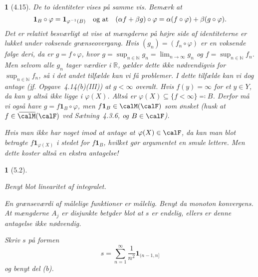 \documentclass[a4paper, 11pt, article, danish, oneside]{memoir}
\newcommand{\overbar}[3]{\mkern #1mu\overline{\mkern-#1mu#3\mkern-#2mu}\mkern #2mu}
\newcommand{\naturals}{\mathbb{N}}
\newcommand{\reals}{\mathbb{R}}
\DeclarePairedDelimiter{\auxdelimparen}{(}{)}
\newcommand{\meas}[2][]{\calM\auxdelimparen[#1]{#2}}
\newcommand{\extmeas}[2][]{\overbar{4.5}{0.5}{\calM}\auxdelimparen[#1]{#2}}
\newcommand{\indicator}[1]{\mathbf{1}_{#1}}
\newcommand{\eqdef}{\eqqcolon}
\renewcommand{\phi}{\varphi}
\newcommand{\preim}[2][]{^{-1}\auxdelimparen[#1]{#2}}
\newcommand{\pencilsymbol}{\raisebox{-2pt}{\normalfont\PencilLeft}}
\theoremstyle{changedotcustomnumber}
\newtheorem{opgave}{\pencilsymbol}
\theoremstyle{changedotbreakcustomnumber}
\newtheorem{opgavebreak}{\pencilsymbol}
\begin{document}
\begin{opgave}[4.15]
    De to identiteter vises på samme vis. Bemærk at
    \begin{equation*}
        \indicator{B} \circ \phi
            = \indicator{\phi\preim{B}}
        \quad \text{og at} \quad
        (\alpha f + \beta g) \circ \phi
            = \alpha (f \circ \phi) + \beta (g \circ \phi).
    \end{equation*}
    Det er relativt besværligt at vise at mængderne på højre side af identiteterne er lukket under voksende grænseovergang. Hvis $(g_n) = (f_n \circ \phi)$ er en voksende følge deri, da er $g = f \circ \phi$, hvor $g = \sup_{n \in \naturals} g_n = \lim_{n \to \infty} g_n$ og $f = \sup_{n \in \naturals} f_n$. Men selvom alle $g_n$ tager værdier i $\reals$, gælder dette ikke nødvendigvis for $\sup_{n \in \naturals} f_n$, så i det andet tilfælde kan vi få problemer. I dette tilfælde kan vi dog antage (jf. Opgave~4.14(b)(III)) at $g < \infty$ overalt. Hvis $f(y) = \infty$ for et $y \in Y$, da kan $y$ altså ikke ligge i $\phi(X)$. Altså er $\phi(X) \subseteq \{f < \infty\} \eqdef B$. Derfor må vi også have $g = f\indicator{B} \circ \phi$, men $f\indicator{B} \in \meas{\calF}$ som ønsket (husk at $f \in \extmeas{\calF}$ ved Sætning~4.3.6, og $B \in \calF$).

    Hvis man ikke har noget imod at antage at $\phi(X) \in \calF$, da kan man blot betragte $f\indicator{\phi(X)}$ i stedet for $f\indicator{B}$, hvilket gør argumentet en smule lettere. Men dette koster altså en ekstra antagelse!
\end{opgave}


\begin{opgavebreak}[5.2]
\begin{solutionsec}
    \item Benyt blot linearitet af integralet.

    \item En grænseværdi af målelige funktioner er målelig. Benyt da monoton konvergens. At mængderne $A_j$ er disjunkte betyder blot at $s$ er endelig, ellers er denne antagelse ikke nødvendig.

    \item Skriv $s$ på formen
    \begin{equation*}
        s
            = \sum_{n=1}^\infty \frac{1}{n^2} \indicator{(n-1,n]}
    \end{equation*}
    og benyt del (b).
\end{solutionsec}
\end{opgavebreak}
\end{document}
